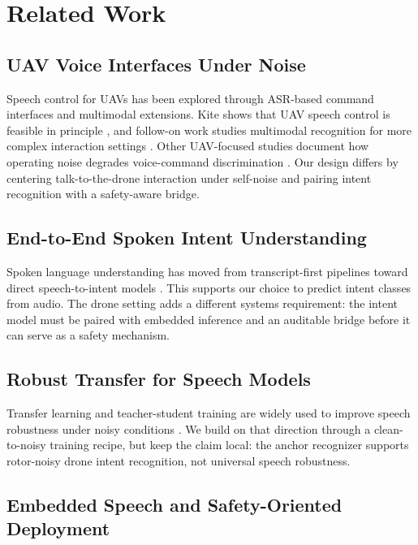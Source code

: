 \section{Related Work}

\subsection{UAV Voice Interfaces Under Noise}

Speech control for UAVs has been explored through ASR-based command interfaces and multimodal extensions. Kite shows that UAV speech control is feasible in principle \cite{oneata19_interspeech}, and follow-on work studies multimodal recognition for more complex interaction settings \cite{oneata2021multimodal}. Other UAV-focused studies document how operating noise degrades voice-command discrimination \cite{miesikowska2021uavnoise,park2023uavvehicle}. Our design differs by centering talk-to-the-drone interaction under self-noise and pairing intent recognition with a safety-aware bridge.

\subsection{End-to-End Spoken Intent Understanding}

Spoken language understanding has moved from transcript-first pipelines toward direct speech-to-intent models \cite{lugosch19_interspeech,kuo20_interspeech,mhiri20_interspeech,ijcai2021p538}. This supports our choice to predict intent classes from audio. The drone setting adds a different systems requirement: the intent model must be paired with embedded inference and an auditable bridge before it can serve as a safety mechanism.

\subsection{Robust Transfer for Speech Models}

Transfer learning and teacher-student training are widely used to improve speech robustness under noisy conditions \cite{park2020improvednoisystudent,baevski2020wav2vec20,yang21c_interspeech}. We build on that direction through a clean-to-noisy training recipe, but keep the claim local: the anchor recognizer supports rotor-noisy drone intent recognition, not universal speech robustness.

\subsection{Embedded Speech and Safety-Oriented Deployment}

